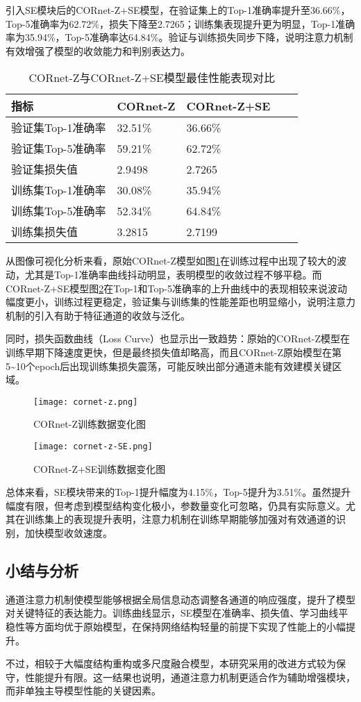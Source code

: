 引入SE模块后的CORnet-Z+SE模型，在验证集上的Top-1准确率提升至36.66\%，Top-5准确率为62.72\%，损失下降至2.7265；训练集表现提升更为明显，Top-1准确率为35.94\%，Top-5准确率达64.84\%。验证与训练损失同步下降，说明注意力机制有效增强了模型的收敛能力和判别表达力。

\begin{table}[htb]
	\centering
	\caption{CORnet-Z与CORnet-Z+SE模型最佳性能表现对比}
	\label{tab:CORnet-Z与CORnet-Z+SE模型最佳性能表现对比}
	\begin{tabular}{lllll}
		\hline
		指标& CORnet-Z & CORnet-Z+SE \\
		\hline
		验证集Top-1准确率 & 32.51\% & 36.66\%  \\
		验证集Top-5准确率 & 59.21\% & 62.72\%  \\
		验证集损失值 & 2.9498 & 2.7265  \\
		训练集Top-1准确率 & 30.08\% & 35.94\%  \\
		训练集Top-5准确率 & 52.34\% & 64.84\%  \\
		训练集损失值 & 3.2815 & 2.7199  \\
		\hline
	\end{tabular}
\end{table}

从图像可视化分析来看，原始CORnet-Z模型如图\ref{f.zzxt}在训练过程中出现了较大的波动，尤其是Top-1准确率曲线抖动明显，表明模型的收敛过程不够平稳。而CORnet-Z+SE模型图\ref{f.zsezxt}在Top-1和Top-5准确率的上升曲线中的表现相较来说波动幅度更小，训练过程更稳定，验证集与训练集的性能差距也明显缩小，说明注意力机制的引入有助于特征通道的收敛与泛化。

同时，损失函数曲线（Loss Curve）也显示出一致趋势：原始的CORnet-Z模型在训练早期下降速度更快，但是最终损失值却略高，而且CORnet-Z原始模型在第5\textasciitilde10个epoch后出现训练集损失震荡，可能反映出部分通道未能有效建模关键区域。

\begin{figure}[hbt]
	\centering
	\texttt{[image: cornet-z.png]}
	\caption{CORnet-Z训练数据变化图}
	\label{f.zzxt}
\end{figure}

\begin{figure}[hbt]
	\centering
	\texttt{[image: cornet-z-SE.png]}
	\caption{CORnet-Z+SE训练数据变化图}
	\label{f.zsezxt}
\end{figure}

总体来看，SE模块带来的Top-1提升幅度为4.15\%，Top-5提升为3.51\%。虽然提升幅度有限，但考虑到模型结构变化极小，参数量变化可忽略，仍具有实际意义。尤其在训练集上的表现提升表明，注意力机制在训练早期能够加强对有效通道的识别，加快模型收敛速度。

\subsection{小结与分析}

通道注意力机制使模型能够根据全局信息动态调整各通道的响应强度，提升了模型对关键特征的表达能力。训练曲线显示，SE模型在准确率、损失值、学习曲线平稳性等方面均优于原始模型，在保持网络结构轻量的前提下实现了性能上的小幅提升。

不过，相较于大幅度结构重构或多尺度融合模型，本研究采用的改进方式较为保守，性能提升有限。这一结果也说明，通道注意力机制更适合作为辅助增强模块，而非单独主导模型性能的关键因素。
